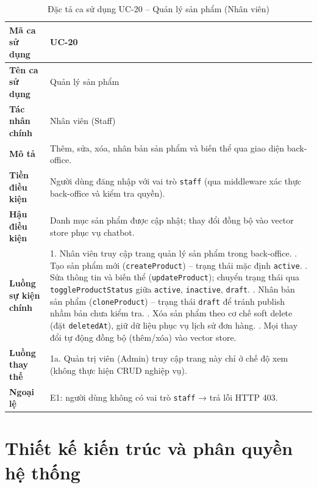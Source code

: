 \begin{longtable}{|p{3cm}|p{10.5cm}|}
  \caption{Đặc tả ca sử dụng UC-20 -- Quản lý sản phẩm (Nhân viên)}
  \label{tab:uc_spec_20} \\
  \hline
  \textbf{Mã ca sử dụng} & UC-20 \\ \hline
  \textbf{Tên ca sử dụng} & Quản lý sản phẩm \\ \hline
  \textbf{Tác nhân chính} & Nhân viên (Staff) \\ \hline
  \textbf{Mô tả} & Thêm, sửa, xóa, nhân bản sản phẩm và biến thể qua giao diện back-office. \\ \hline
  \textbf{Tiền điều kiện} & Người dùng đăng nhập với vai trò \texttt{staff} (qua middleware xác thực back-office và kiểm tra quyền). \\ \hline
  \textbf{Hậu điều kiện} & Danh mục sản phẩm được cập nhật; thay đổi đồng bộ vào vector store phục vụ chatbot. \\ \hline
  \textbf{Luồng sự kiện chính} &
  1. Nhân viên truy cập trang quản lý sản phẩm trong back-office. \newline
  2. Tạo sản phẩm mới (\texttt{createProduct}) -- trạng thái mặc định \texttt{active}. \newline
  3. Sửa thông tin và biến thể (\texttt{updateProduct}); chuyển trạng thái qua \texttt{toggleProductStatus} giữa \texttt{active}, \texttt{inactive}, \texttt{draft}. \newline
  4. Nhân bản sản phẩm (\texttt{cloneProduct}) -- trạng thái \texttt{draft} để tránh publish nhầm bản chưa kiểm tra. \newline
  5. Xóa sản phẩm theo cơ chế soft delete (đặt \texttt{deletedAt}), giữ dữ liệu phục vụ lịch sử đơn hàng. \newline
  6. Mọi thay đổi tự động đồng bộ (thêm\slash xóa) vào vector store. \\ \hline
  \textbf{Luồng thay thế} & 1a. Quản trị viên (Admin) truy cập trang này chỉ ở chế độ xem (không thực hiện CRUD nghiệp vụ). \\ \hline
  \textbf{Ngoại lệ} & E1: người dùng không có vai trò \texttt{staff} → trả lỗi HTTP 403. \\ \hline
\end{longtable}

\section{Thiết kế kiến trúc và phân quyền hệ thống}
\label{sec:c3_architecture}

